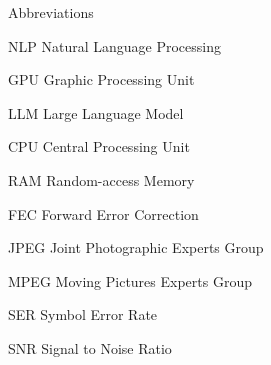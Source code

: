 
\begin{dictionary}{Abbreviations}
\item[NLP]	Natural Language Processing
\item[GPU]	Graphic Processing Unit
\item[LLM]	Large Language Model
\item[CPU]	Central Processing Unit
\item[RAM]	Random-access Memory
\item[FEC]	Forward Error Correction
\item[JPEG]	Joint Photographic Experts Group
\item[MPEG]	Moving Pictures Experts Group
\item[SER]	Symbol Error Rate
\item[SNR]	Signal to Noise Ratio
\end{dictionary}
